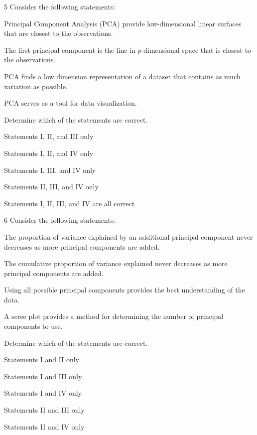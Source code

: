 \begin{question}{5}
Consider the following statements:
\begin{statements}
\item Principal Component Analysis (PCA) provide low-dimensional linear surfaces that are closest to the observations.
\item The first principal component is the line in $p$-dimensional space that is closest to the observations.
\item PCA finds a low dimension representation of a dataset that contains as much variation as possible.
\item PCA serves as a tool for data visualization.
\end{statements}

Determine which of the statements are correct.

\begin{choices}
\item Statements I, II, and III only
\item Statements I, II, and IV only
\item Statements I, III, and IV only
\item Statements II, III, and IV only
\item Statements I, II, III, and IV are all correct
\end{choices}
\end{question}

\begin{question}{6}
Consider the following statements:
\begin{statements}
\item The proportion of variance explained by an additional principal component never decreases as more principal components are added.
\item The cumulative proportion of variance explained never decreases as more principal components are added.
\item Using all possible principal components provides the best understanding of the data.
\item A scree plot provides a method for determining the number of principal components to use.
\end{statements}

Determine which of the statements are correct.

\begin{choices}
\item Statements I and II only
\item Statements I and III only
\item Statements I and IV only
\item Statements II and III only
\item Statements II and IV only
\end{choices}
\end{question}


